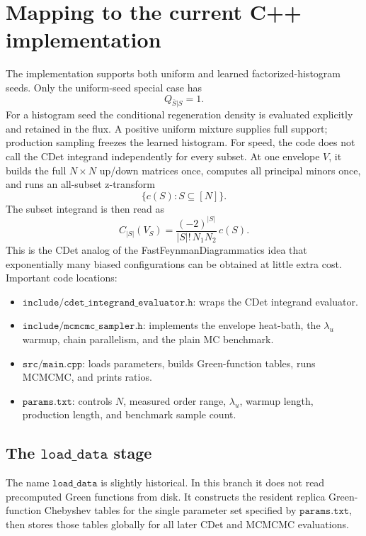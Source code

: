 \documentclass[11pt]{article}
\newcommand{\1}{\mathbf{1}}
\newcommand{\card}[1]{\left|#1\right|}
\begin{document}
\section{Mapping to the current C++ implementation}

The implementation supports both uniform and learned factorized-histogram
seeds.  Only the uniform-seed special case has
\[
  Q_{\bar S|S}=1.
\]
For a histogram seed the conditional regeneration density is evaluated
explicitly and retained in the flux.  A positive uniform mixture supplies
full support; production sampling freezes the learned histogram.
For speed, the code does not call the CDet integrand independently for every
subset.  At one envelope \(V\), it builds the full \(N\times N\) up/down
matrices once, computes all principal minors once, and runs an all-subset
z-transform
\[
  \{c(S):S\subseteq[N]\}.
\]
The subset integrand is then read as
\[
  C_{\card{S}}(V_S)
  =
  \frac{(-2)^{\card{S}}}{\card{S}!\,N_1N_2}\,c(S).
\]
This is the CDet analog of the FastFeynmanDiagrammatics idea that exponentially
many biased configurations can be obtained at little extra cost.
Important code locations:
\begin{itemize}[leftmargin=2em]
  \item \(\texttt{include/cdet\_integrand\_evaluator.h}\): wraps the CDet
  integrand evaluator.
  \item \(\texttt{include/mcmcmc\_sampler.h}\): implements the envelope
  heat-bath, the \(\lambda_u\) warmup, chain parallelism, and the plain MC
  benchmark.
  \item \(\texttt{src/main.cpp}\): loads parameters, builds Green-function
  tables, runs MCMCMC, and prints ratios.
  \item \(\texttt{params.txt}\): controls \(N\), measured order range,
  \(\lambda_u\), warmup length, production length, and benchmark sample count.
\end{itemize}

\subsection{The \(\texttt{load\_data}\) stage}

The name \(\texttt{load\_data}\) is slightly historical.  In this branch it
does not read precomputed Green functions from disk.  It constructs the
resident replica Green-function Chebyshev tables for the single parameter set
specified by \(\texttt{params.txt}\), then stores those tables globally for all
later CDet and MCMCMC evaluations.
\end{document}
